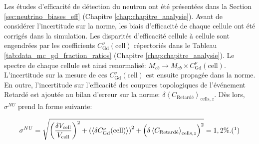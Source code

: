 \bigbreak

Les études d'efficacité de détection du neutron ont été présentées dans la Section \ref{sec:neutrino_biases_eff} (Chapitre \ref{chap:chapitre_analysie}). Avant de considérer l'incertitude sur la norme, les biais d'efficacité de chaque cellule ont été corrigés dans la simulation. Les disparités d'efficacité cellule à cellule sont engendrées par les coefficients $C_\textrm{Gd}^\nu(\textrm{cell})$ répertoriés dans le Tableau \ref{tab:data_mc_gd_fraction_ratios} (Chapitre \ref{chap:chapitre_analysie}). Le spectre de chaque cellule est ainsi renormalisé: $M_{cb} \rightarrow M_{cb} \times C_\textrm{Gd}^\nu(\textrm{cell})$. L'incertitude sur la mesure de ces $C_\textrm{Gd}^\nu(\textrm{cell})$ est ensuite propagée dans la norme. En outre, l'incertitude sur l'efficacité des coupures topologiques de l'événement Retardé est ajoutée au bilan d'erreur sur la norme: $\delta \left<C_\textrm{Retardé} \right>_{\textrm{cells},z}$. Dès lors, $\sigma^{NU}$ prend la forme suivante:

\begin{equation}
    \sigma^{NU} = \sqrt{\left(\frac{\delta V_\textrm{cell}}{V_\textrm{cell}}\right)^2 + \left(\left< \delta C_\textrm{Gd}^\nu(\textrm{cell}) \right>\right)^2 + \left(\delta \left<C_\textrm{Retardé} \right>_{\textrm{cells},z}\right)^2} = 1,2\%. (\footnotemark)
\end{equation}

